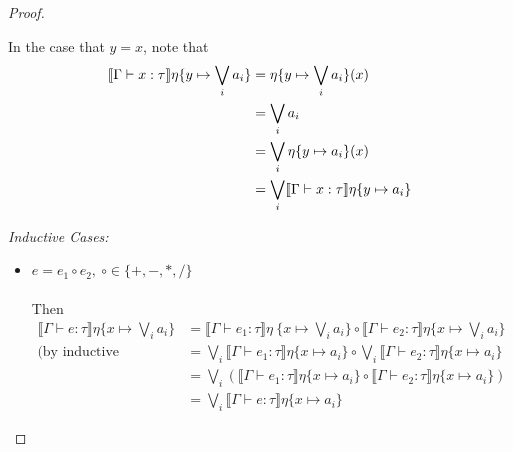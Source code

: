 \begin{proof}
\begin{itemize}
 In the case that $y = x$, note that
  \begin{align*}
  \llbracket \Gamma \vdash x : \tau \rrbracket\eta\{y\mapsto\bigvee_i a_i\} &= \eta\{y\mapsto \bigvee_i a_i\}(x) \\
  &= \bigvee_i a_i \\
  &=\bigvee_i \eta\{y \mapsto a_i\}(x)  \\
  &= \bigvee_i\llbracket{{\Gamma}\vdash{x}:{\tau}}\rrbracket{\eta\{{y}\mapsto{a_i}\}} \\
  \end{align*}
 \end{itemize}
 \emph{Inductive Cases: }
 \begin{itemize}
 \item $e = e_1 \circ e_2, \ \circ \in \{+, -, *, / \}$ \\ \\
 Then 
 \begin{align*}
 \llbracket \Gamma \vdash e : \tau \rrbracket\eta\{x \mapsto \bigvee_i a_i\} &= \llbracket \Gamma\vdash e_1 : \tau 
 \rrbracket\eta\ \{x \mapsto \bigvee_i a_i\} \circ \llbracket \Gamma \vdash e_2 : \tau \rrbracket\eta\{x \mapsto \bigvee_i a_i\}\\
  \text{(by inductive hypothesis)} &=  \bigvee_i\llbracket \Gamma \vdash e_1: \tau \rrbracket\eta\{x\mapsto a_i\} \circ
  \bigvee_i\llbracket \Gamma \vdash e_2: \tau \rrbracket\eta\{x\mapsto a_i\}  \\
  &= \bigvee_i(\llbracket \Gamma \vdash e_1: \tau \rrbracket\eta\{x\mapsto a_i\} \circ 
  \llbracket \Gamma \vdash e_2: \tau \rrbracket\eta\{x\mapsto a_i\}) \\
  &= \bigvee_i \llbracket \Gamma \vdash e: \tau \rrbracket\eta\{x\mapsto a_i\}
 \end{align*}


\end{itemize}
\end{proof}
